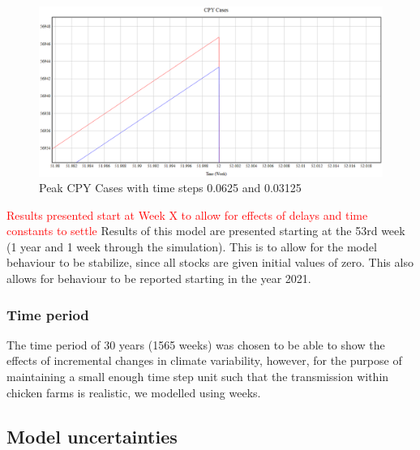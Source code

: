 \begin{figure}[h]
\centering
\includegraphics[width=\textwidth]{images/timestep.PNG}
\caption{Peak CPY Cases with time steps 0.0625 and 0.03125}
\end{figure}

\textcolor{red}{Results presented start at Week X to allow for effects of delays and time constants to settle}
Results of this model are presented starting at the 53rd week (1 year and 1 week through the simulation). This is to allow for the model behaviour to be stabilize, since all stocks are given initial values of zero. This also allows for behaviour to be reported starting in the year 2021.

\subsubsection{Time period}
The time period of 30 years (1565 weeks) was chosen to be able to show the effects of incremental changes in climate variability, however, for the purpose of maintaining a small enough time step unit such that the transmission within chicken farms is realistic, we modelled using weeks.

\subsection{Model uncertainties}

